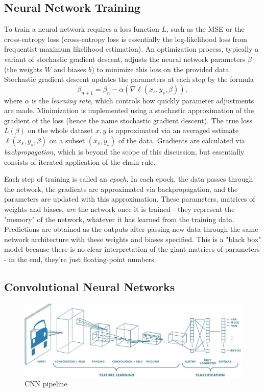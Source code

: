 \documentclass[12pt]{article}
\begin{document}
	
\subsection{Neural Network Training}
\label{subsection:neural-network-training}

To train a neural network requires a loss function $L$, such as the MSE or the cross-entropy loss (cross-entropy loss is essentially the log-likelihood loss from frequentist maximum likelihood estimation). An optimization process, typically a variant of stochastic gradient descent, adjusts the neural network parameters $\beta$ (the weights $W$ and biases $b$) to minimize this loss on the provided data. Stochastic gradient descent updates the parameters at each step by the formula
$$
\beta_{n+1} = \beta_n - \alpha (\nabla \ell(x_s, y_s, \beta)),
$$
where $\alpha$ is the \textit{learning rate}, which controls how quickly parameter adjustments are made. Minimization is implemented using a stochastic approximation of the gradient of the loss (hence the name stochastic gradient descent). The true loss $L(\beta)$ on the whole dataset $x, y$ is approximated via an averaged estimate $\ell(x_s, y_s, \beta)$ on a subset $(x_s, y_s)$ of the data. Gradients are calculated via \textit{backpropagation}, which is beyond the scope of this discussion, but essentially consists of iterated application of the chain rule. 

Each step of training is called an \textit{epoch}. In each epoch, the data passes through the network, the gradients are approximated via backpropagation, and the parameters are updated with this approximation. These parameters, matrices of weights and biases, \textit{are} the network once it is trained - they represent the "memory" of the network, whatever it has learned from the training data. Predictions are obtained as the outputs after passing new data through the same network architecture with these weights and biases specified. This is a "black box" model because there is no clear interpretation of the giant matrices of parameters - in the end, they're just floating-point numbers. 



\subsection{Convolutional Neural Networks }

\begin{figure}[H]
	\centering
	\includegraphics[width=.8\textwidth]{../Images/big-pic-cnn.jpg}
	\caption{CNN pipeline \cite{eli5CNN}}
	\label{fig:cnn-pipeline}
\end{figure}
\end{document}
